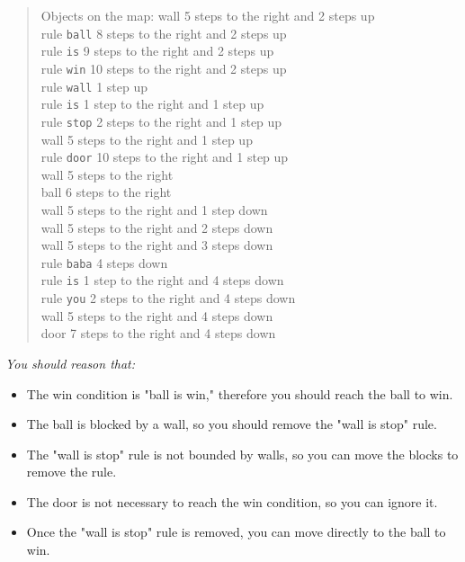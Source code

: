 \begin{GreenBox}[frametitle={\textbf{Iteration 1 Baba-is-ai Prompt}}]
\begin{quote}
Objects on the map:  
wall 5 steps to the right and 2 steps up  \\
rule \texttt{ball} 8 steps to the right and 2 steps up  \\
rule \texttt{is} 9 steps to the right and 2 steps up  \\
rule \texttt{win} 10 steps to the right and 2 steps up  \\
rule \texttt{wall} 1 step up  \\
rule \texttt{is} 1 step to the right and 1 step up  \\
rule \texttt{stop} 2 steps to the right and 1 step up \\ 
wall 5 steps to the right and 1 step up  \\
rule \texttt{door} 10 steps to the right and 1 step up  \\
wall 5 steps to the right  \\
ball 6 steps to the right  \\
wall 5 steps to the right and 1 step down  \\
wall 5 steps to the right and 2 steps down  \\
wall 5 steps to the right and 3 steps down  \\
rule \texttt{baba} 4 steps down  \\
rule \texttt{is} 1 step to the right and 4 steps down  \\
rule \texttt{you} 2 steps to the right and 4 steps down \\ 
wall 5 steps to the right and 4 steps down  \\
door 7 steps to the right and 4 steps down \\
\end{quote}

\textit{You should reason that:}
\begin{itemize}
    \item The win condition is "ball is win," therefore you should reach the ball to win.
    \item The ball is blocked by a wall, so you should remove the "wall is stop" rule.
    \item The "wall is stop" rule is not bounded by walls, so you can move the blocks to remove the rule.
    \item The door is not necessary to reach the win condition, so you can ignore it.
    \item Once the "wall is stop" rule is removed, you can move directly to the ball to win.
\end{itemize}


\end{GreenBox}
